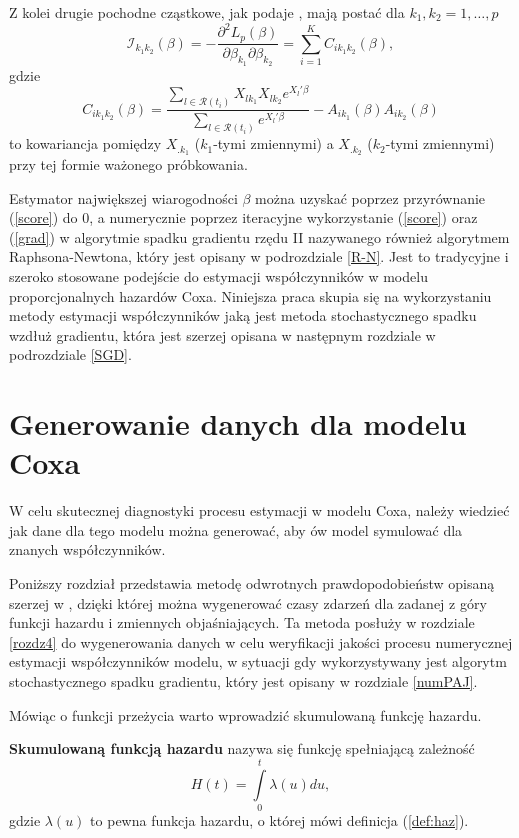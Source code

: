 Z kolei drugie pochodne cząstkowe, jak podaje \cite{cox}, mają postać dla $k_1,k_2=1,\dots,p$
\begin{equation}\label{grad}
\mathscr{I}_{k_1k_2}(\beta) = - \dfrac{\partial^2L_p(\beta)}{\partial\beta_{k_1}\partial\beta_{k_2}}=\sum\limits_{i=1}^{K}C_{ik_1k_2}(\beta),
\end{equation}
gdzie
\begin{equation}
C_{ik_1k_2}(\beta)=\dfrac{\sum\limits_{l\in \mathscr{R}(t_i)}^{} X_{lk_1}X_{lk_2}e^{X_l'\beta}}{\sum\limits_{l\in \mathscr{R}(t_i)}^{} e^{X_l'\beta}} - A_{ik_1}(\beta)A_{ik_2}(\beta)
\end{equation}
to kowariancja pomiędzy $X_{.k_1}$ ($k_1$-tymi zmiennymi) a $X_{.k_2}$ ($k_2$-tymi zmiennymi) przy tej formie ważonego próbkowania.

Estymator największej wiarogodności $\beta$ można uzyskać poprzez przyrównanie (\ref{score}) do $0$, a numerycznie poprzez iteracyjne wykorzystanie (\ref{score}) oraz (\ref{grad}) w algorytmie spadku gradientu rzędu II nazywanego również algorytmem Raphsona-Newtona, który jest opisany w podrozdziale \ref{R-N}. Jest to tradycyjne i szeroko stosowane podejście do estymacji współczynników w modelu proporcjonalnych hazardów Coxa. Niniejsza praca skupia się na wykorzystaniu metody estymacji współczynników jaką jest metoda stochastycznego spadku wzdłuż gradientu, która jest szerzej opisana w następnym rozdziale w podrozdziale \ref{SGD}.

\newpage

\section{Generowanie danych dla modelu Coxa}

W celu skutecznej diagnostyki procesu estymacji w modelu Coxa, należy wiedzieć jak dane dla tego modelu można generować, aby ów model symulować dla znanych współczynników.

Poniższy rozdział przedstawia metodę odwrotnych prawdopodobieństw opisaną szerzej w \cite{bender}, dzięki której można wygenerować czasy zdarzeń dla zadanej z góry funkcji hazardu i zmiennych objaśniających. Ta metoda posłuży w rozdziale \ref{rozdz4} do wygenerowania danych w celu weryfikacji jakości procesu numerycznej estymacji współczynników modelu, w sytuacji gdy wykorzystywany jest algorytm stochastycznego spadku gradientu, który jest opisany w rozdziale \ref{numPAJ}.

Mówiąc o funkcji przeżycia warto wprowadzić skumulowaną funkcję hazardu.
\begin{definition}
\textbf{Skumulowaną funkcją hazardu} nazywa się funkcję spełniającą zależność
\begin{equation}\label{zaradzix}
H(t) = \int\limits_{0}^{t}\lambda(u) du,
\end{equation}
gdzie $\lambda(u)$ to pewna funkcja hazardu, o której mówi definicja (\ref{def:haz}).
\end{definition}


